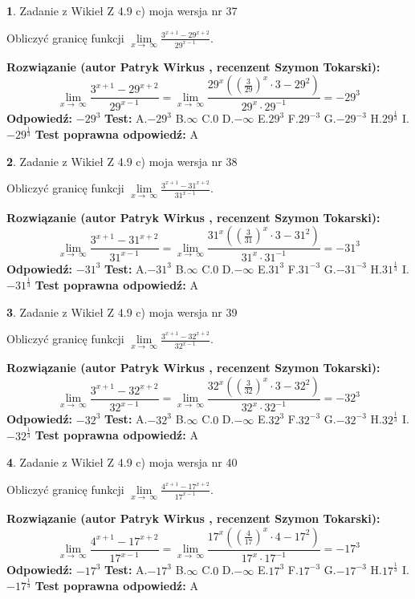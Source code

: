 \documentclass[12pt, a4paper]{article}
\theoremstyle{definition} %
\newtheorem{zad}{}
\newcommand{\zadStart}[1]{\begin{zad}#1\newline}
\newcommand{\zadStop}{\end{zad}}
\newcommand{\rozwStart}[2]{\noindent \textbf{Rozwiązanie (autor #1 , recenzent #2): }\newline}
\newcommand{\rozwStop}{\newline}
\newcommand{\odpStart}{\noindent \textbf{Odpowiedź:}\newline}
\newcommand{\odpStop}{\newline}
\newcommand{\testStart}{\noindent \textbf{Test:}\newline}
\newcommand{\testStop}{\newline}
\newcommand{\kluczStart}{\noindent \textbf{Test poprawna odpowiedź:}\newline}
\newcommand{\kluczStop}{\newline}
\begin{document}
\zadStart{Zadanie z Wikieł Z 4.9 c) moja wersja nr 37}


Obliczyć granicę funkcji  $\lim\limits_{x\to\ \infty}\frac{3^{x+1}-29^{x+2}}{29^{x-1}}$.
\zadStop
\rozwStart{Patryk Wirkus}{Szymon Tokarski}
$$\lim\limits_{x\to\ \infty}\frac{3^{x+1}-29^{x+2}}{29^{x-1}}=\lim\limits_{x\to\ \infty}\frac{29^{x}((\frac{3}{29})^{x}\cdot 3 -29^{2})}{29^{x}\cdot 29^{-1}} = -29^{3}$$
\rozwStop
\odpStart
$-29^{3}$
\odpStop
\testStart
A.$-29^{3}$ B.$\infty$ C.$0$ D.$-\infty$ E.$29^{3}$
F.$29^{-3}$ G.$-29^{-3}$
H.$29^{\frac{1}{3}}$
I.$-29^{\frac{1}{3}}$
\testStop
\kluczStart
A
\kluczStop



\zadStart{Zadanie z Wikieł Z 4.9 c) moja wersja nr 38}


Obliczyć granicę funkcji  $\lim\limits_{x\to\ \infty}\frac{3^{x+1}-31^{x+2}}{31^{x-1}}$.
\zadStop
\rozwStart{Patryk Wirkus}{Szymon Tokarski}
$$\lim\limits_{x\to\ \infty}\frac{3^{x+1}-31^{x+2}}{31^{x-1}}=\lim\limits_{x\to\ \infty}\frac{31^{x}((\frac{3}{31})^{x}\cdot 3 -31^{2})}{31^{x}\cdot 31^{-1}} = -31^{3}$$
\rozwStop
\odpStart
$-31^{3}$
\odpStop
\testStart
A.$-31^{3}$ B.$\infty$ C.$0$ D.$-\infty$ E.$31^{3}$
F.$31^{-3}$ G.$-31^{-3}$
H.$31^{\frac{1}{3}}$
I.$-31^{\frac{1}{3}}$
\testStop
\kluczStart
A
\kluczStop



\zadStart{Zadanie z Wikieł Z 4.9 c) moja wersja nr 39}


Obliczyć granicę funkcji  $\lim\limits_{x\to\ \infty}\frac{3^{x+1}-32^{x+2}}{32^{x-1}}$.
\zadStop
\rozwStart{Patryk Wirkus}{Szymon Tokarski}
$$\lim\limits_{x\to\ \infty}\frac{3^{x+1}-32^{x+2}}{32^{x-1}}=\lim\limits_{x\to\ \infty}\frac{32^{x}((\frac{3}{32})^{x}\cdot 3 -32^{2})}{32^{x}\cdot 32^{-1}} = -32^{3}$$
\rozwStop
\odpStart
$-32^{3}$
\odpStop
\testStart
A.$-32^{3}$ B.$\infty$ C.$0$ D.$-\infty$ E.$32^{3}$
F.$32^{-3}$ G.$-32^{-3}$
H.$32^{\frac{1}{3}}$
I.$-32^{\frac{1}{3}}$
\testStop
\kluczStart
A
\kluczStop



\zadStart{Zadanie z Wikieł Z 4.9 c) moja wersja nr 40}


Obliczyć granicę funkcji  $\lim\limits_{x\to\ \infty}\frac{4^{x+1}-17^{x+2}}{17^{x-1}}$.
\zadStop
\rozwStart{Patryk Wirkus}{Szymon Tokarski}
$$\lim\limits_{x\to\ \infty}\frac{4^{x+1}-17^{x+2}}{17^{x-1}}=\lim\limits_{x\to\ \infty}\frac{17^{x}((\frac{4}{17})^{x}\cdot 4 -17^{2})}{17^{x}\cdot 17^{-1}} = -17^{3}$$
\rozwStop
\odpStart
$-17^{3}$
\odpStop
\testStart
A.$-17^{3}$ B.$\infty$ C.$0$ D.$-\infty$ E.$17^{3}$
F.$17^{-3}$ G.$-17^{-3}$
H.$17^{\frac{1}{3}}$
I.$-17^{\frac{1}{3}}$
\testStop
\kluczStart
A
\kluczStop
\end{document}
